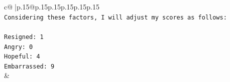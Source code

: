 \documentclass{article}
\begin{document}
{\begin{supertabular}{c@{$\;$}|p{.15\linewidth}@{}p{.15\linewidth}p{.15\linewidth}p{.15\linewidth}p{.15\linewidth}p{.15\linewidth}}
{{{\\ 
\texttt{Considering these factors, I will adjust my scores as follows:} \\
\\ 
\texttt{Resigned: 1} \\
\texttt{Angry: 0} \\
\texttt{Hopeful: 4} \\
\texttt{Embarrassed: 9} \\
            }
        }
    }
    & \\ \\

\end{supertabular}
}
\end{document}
